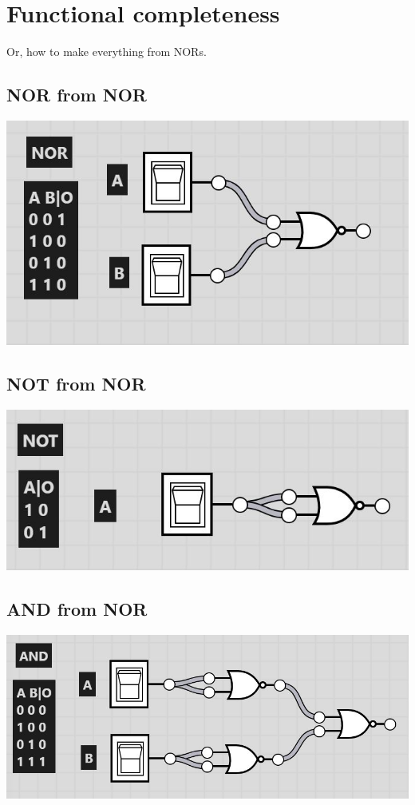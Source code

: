 \documentclass[11pt]{book}
\begin{document}
\section{Functional completeness}
Or, how to make everything from NORs.
\subsection{NOR from NOR}

\includegraphics[width=\textwidth]{figures/NOR.jpg}

\subsection{NOT from NOR}

\includegraphics[width=\textwidth]{figures/NOT.jpg}

\subsection{AND from NOR}

\includegraphics[width=\textwidth]{figures/AND.jpg}
\end{document}

